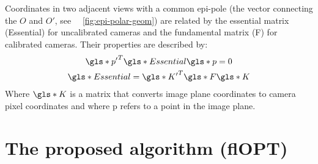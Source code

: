 \documentclass{osa-article}
\begin{document}
Coordinates in two adjacent views with a common epi-pole (the vector connecting the \(O\) and \(O'\), see \figurename~~\ref{fig:epi-polar-geom}) are related by the essential matrix (\gls*{Essential}) for uncalibrated cameras and the fundamental matrix (\gls*{F}) for calibrated cameras.
Their properties are described by:
\begin{gather}
  \gls*{p'}^T \gls*{Essential} \gls*{p} = 0 \label{eq:pEp}\\
  \gls*{Essential} = \gls*{K'}^T \gls*{F} \gls*{K} %
\end{gather}
Where \(\gls*{K}\) is a matrix that converts image plane coordinates to camera pixel coordinates and where \gls*{p} refers to a point in the image plane.

\section*{The proposed algorithm (flOPT)}
\end{document}
